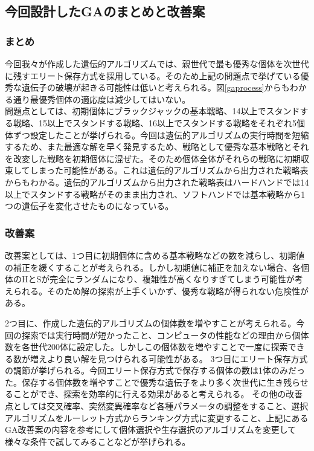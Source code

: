 \subsection{今回設計したGAのまとめと改善案}
\subsubsection{まとめ}
今回我々が作成した遺伝的アルゴリズムでは、親世代で最も優秀な個体を次世代に残すエリート保存方式を採用している。そのため上記の問題点で挙げている優秀な遺伝子の破壊が起きる可能性は低いと考えられる。図\ref{gaprocess}からもわかる通り最優秀個体の適応度は減少してはいない。\\
問題点としては、初期個体にブラックジャックの基本戦略、14以上でスタンドする戦略、15以上でスタンドする戦略、16以上でスタンドする戦略をそれぞれ5個体ずつ設定したことが挙げられる。今回は遺伝的アルゴリズムの実行時間を短縮するため、また最適な解を早く発見するため、戦略として優秀な基本戦略とそれを改変した戦略を初期個体に混ぜた。そのため個体全体がそれらの戦略に初期収束してしまった可能性がある。これは遺伝的アルゴリズムから出力された戦略表からもわかる。遺伝的アルゴリズムから出力された戦略表はハードハンドでは14以上でスタンドする戦略がそのまま出力され、ソフトハンドでは基本戦略から1つの遺伝子を変化させたものになっている。

\subsubsection{改善案}
改善案としては、1つ目に初期個体に含める基本戦略などの数を減らし、初期値の補正を緩くすることが考えられる。しかし初期値に補正を加えない場合、各個体のHとSが完全にランダムになり、複雑性が高くなりすぎてしまう可能性が考えられる。そのため解の探索が上手くいかず、優秀な戦略が得られない危険性がある。

2つ目に、作成した遺伝的アルゴリズムの個体数を増やすことが考えられる。今回の探索では実行時間が短かったこと、コンピュータの性能などの理由から個体数を各世代200体に設定した。しかしこの個体数を増やすことで一度に探索できる数が増えより良い解を見つけられる可能性がある。
3つ目にエリート保存方式の調節が挙げられる。今回エリート保存方式で保存する個体の数は1体のみだった。保存する個体数を増やすことで優秀な遺伝子をより多く次世代に生き残らせることができ、探索を効率的に行える効果があると考えられる。
その他の改善点としては交叉確率、突然変異確率など各種パラメータの調整をすること、選択アルゴリズムをルーレット方式からランキング方式に変更すること、上記にあるGA改善案の内容を参考にして個体選択や生存選択のアルゴリズムを変更して様々な条件で試してみることなどが挙げられる。
